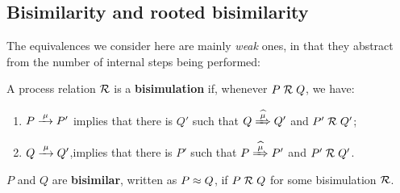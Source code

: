 \subsection{Bisimilarity and rooted bisimilarity}
\label{ss:BiEx}

The equivalences we consider here are mainly \emph{weak} ones, in that they
abstract from the number of internal steps being performed:
\begin{definition}%
\label{d:wb}
A process relation ${{\cal R}}$ is a \textbf{bisimulation} if, whenever
 $P\mathrel{\cal R} Q$, %
we have:
\begin{enumerate}
\item $P \arr\mu P'$ implies that there is $Q'$ such that $Q \Arcap \mu Q'$ and $P' \mathrel{\cal R} Q'$;\vspace{-4pt}
\item $Q \arr\mu Q'$,implies that there is $P'$ such that $P \Arcap
  \mu P'$ and $P' \mathrel{\cal R} Q'$.
\end{enumerate}  
 $P$ and $Q$ are \textbf{bisimilar},
written as $P \approx Q$, if $P \mathrel{\cal R} Q$ for some bisimulation ${\cal R}$.
\end{definition}

